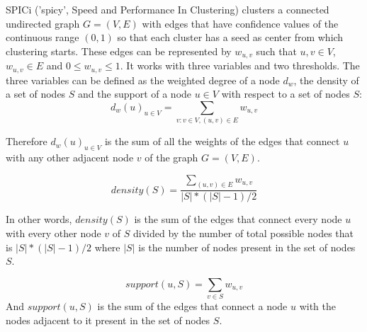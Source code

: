 \documentclass[10pt]{extarticle}
\begin{document}
	SPICi ('spicy', Speed and Performance In Clustering) clusters a connected undirected graph $G=(V,E)$ with edges that have confidence values of the continuous range $(0,1)$ so that each cluster has a seed as center from which clustering starts. These edges can be represented by $w_{u,v}$ such that $u,v\in V$, $w_{u,v}\in E$ and $0\le w_{u,v}\le1$. It works with three variables and two thresholds. The three variables can be defined as the weighted degree of a node $d_w$, the density of a set of nodes $S$ and the support of a node $u\in V$ with respect to a set of nodes $S$:
	\begin{equation}
	d_w(u)_{u\in V} = \sum_{v:v\in V,(u,v) \in E}w_{u,v}
	\end{equation}
	
	Therefore $d_w(u)_{u\in V}$ is the sum of all the weights of the edges that connect $u$ with any other adjacent node $v$ of the graph $G=(V,E)$.
	
	\begin{equation}
	density(S) = \frac{\sum_{(u,v)\in E}w_{u,v}}{|S|*(|S|-1)/2} 
	\end{equation}
	
	In other words, $density(S)$ is the sum of the edges that connect every node $u$ with every other node $v$ of $S$ divided by the number of total possible nodes that is $|S|*(|S|-1)/2$ where $|S|$ is the number of nodes present in the set of nodes $S$.
	
	\begin{equation} \label{support}
	support(u,S) = \sum_{v\in S} w_{u,v}
	\end{equation}
	And $support(u,S)$ is the sum of the edges that connect a node $u$ with the nodes adjacent to it present in the set of nodes $S$.
	
\end{document}
